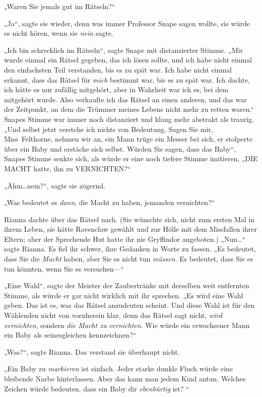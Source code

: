 {„Waren Sie jemals gut im Rätseln?“

„Ja“, sagte sie wieder, denn was immer Professor Snape sagen wollte, sie würde es nicht hören, wenn sie \emph{nein} sagte.

„Ich bin schrecklich im Rätseln“, sagte Snape mit distanzierter Stimme. „Mir wurde einmal ein Rätsel gegeben, das ich lösen sollte, und ich habe nicht einmal den einfachsten Teil verstanden, bis es zu spät war. Ich habe nicht einmal erkannt, dass das Rätsel für \emph{mich} bestimmt war, bis es zu spät war. Ich dachte, ich hätte es nur zufällig mitgehört, aber in Wahrheit war ich es, bei dem mitgehört wurde. Also verkaufte ich das Rätsel an einen anderen, und das war der Zeitpunkt, an dem die Trümmer meines Lebens nicht mehr zu retten waren.“ Snapes Stimme war immer noch distanziert und klang mehr abstrakt als traurig. „Und selbst jetzt verstehe ich nichts von Bedeutung. Sagen Sie mir, Miss~Felthorne, nehmen wir an, ein Mann trüge ein Messer bei sich, er stolperte über ein Baby und erstäche sich selbst. Würden Sie sagen, dass das Baby“, Snapes Stimme senkte sich, als würde er eine noch tiefere Stimme imitieren, „DIE MACHT hatte, ihn zu VERNICHTEN?“

„Ähm…nein?“, sagte sie zögernd.

„Was bedeutet es \emph{dann}, die Macht zu haben, jemanden vernichten?“

Rianna dachte über das Rätsel nach. (Sie wünschte sich, nicht zum ersten Mal in ihrem Leben, sie hätte Ravenclaw gewählt und zur Hölle mit dem Missfallen ihrer Eltern; aber der Sprechende Hut hatte ihr nie Gryffindor angeboten.) „Nun…“ sagte Rianna. Es fiel ihr schwer, ihre Gedanken in Worte zu fassen. „Es bedeutet, dass Sie die \emph{Macht} haben, aber Sie es nicht tun \emph{müssen}. Es bedeutet, dass Sie es tun könnten, wenn Sie es versuchen—“

„Eine Wahl“, sagte der Meister der Zaubertränke mit derselben weit entfernten Stimme, als würde er gar nicht wirklich mit ihr sprechen. „Es wird eine Wahl geben. Das ist es, was das Rätsel anzudeuten scheint. Und diese Wahl ist für den Wählenden nicht von vornherein klar, denn das Rätsel sagt nicht, \emph{wird} \emph{vernichten}, sondern \emph{die Macht zu} \emph{vernichten}. Wie würde ein erwachsener Mann ein Baby als seinesgleichen kennzeichnen?“

„Was?“, sagte Rianna. Das verstand sie überhaupt nicht.

„Ein Baby zu \emph{markieren} ist einfach. Jeder starke dunkle Fluch würde eine bleibende Narbe hinterlassen. Aber das kann man jedem Kind antun. Welches Zeichen würde bedeuten, dass ein Baby dir \emph{ebenbürtig} ist? “

}
